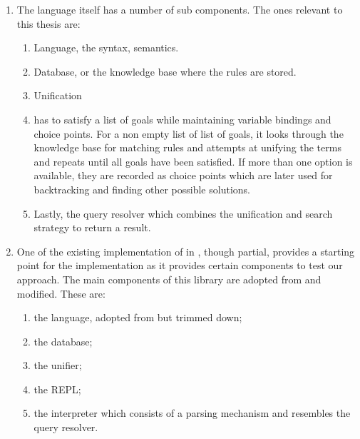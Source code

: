 \documentclass[thesis-solanki.tex]{subfiles}
\begin{document}
\begin{enumerate}
\item {}

The language itself has a number of sub components.
The ones relevant to this thesis are:
\begin{enumerate}
\item Language, the syntax, semantics.

\item Database, or the knowledge base where the rules are stored.

\item Unification

\item
   has to satisfy a list of goals while maintaining variable bindings and choice points.
  For a non empty list of list of goals, it looks through the knowledge base for matching rules and attempts at
  unifying the terms and repeats until all goals have been satisfied.
  If more than one option is available, they are recorded as choice points which are later used for backtracking
  and finding other possible solutions.

\item
  Lastly, the query resolver which combines the unification and search strategy to return a result.
\end{enumerate}

\item {} \cite{prolog-lib}

  One of the existing implementation of  in , though partial, provides a
  starting point for the implementation as it provides certain components to test our approach.
  The main components of this library are adopted from  and modified.
  These are:

\begin{enumerate}
\item the language, adopted from  but trimmed down;

\item the database;

\item the unifier;

\item the REPL;

\item the interpreter which consists of a parsing mechanism and resembles the query resolver.
\end{enumerate}


\end{enumerate}
\end{document}
